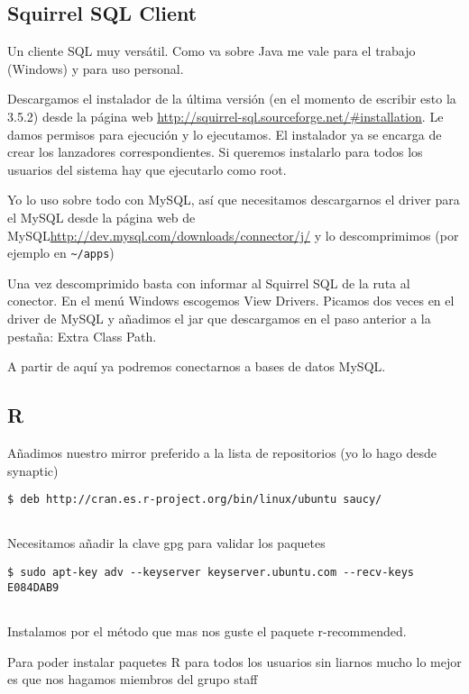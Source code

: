 \subsection{Squirrel SQL Client}\label{squirrel-sql-client}

Un cliente SQL muy versátil. Como va sobre Java me vale para el trabajo
(Windows) y para uso personal.

Descargamos el instalador de la última versión (en el momento de
escribir esto la 3.5.2) desde la página web
\url{http://squirrel-sql.sourceforge.net/\#installation}. Le damos
permisos para ejecución y lo ejecutamos. El instalador ya se encarga de
crear los lanzadores correspondientes. Si queremos instalarlo para todos
los usuarios del sistema hay que ejecutarlo como root.

Yo lo uso sobre todo con MySQL, así que necesitamos descargarnos el
driver para el MySQL desde la página web de
MySQL\url{http://dev.mysql.com/downloads/connector/j/} y lo
descomprimimos (por ejemplo en \texttt{\textasciitilde{}/apps})

Una vez descomprimido basta con informar al Squirrel SQL de la ruta al
conector. En el menú Windows escogemos View Drivers. Picamos dos veces
en el driver de MySQL y añadimos el jar que descargamos en el paso
anterior a la pestaña: Extra Class Path.

A partir de aquí ya podremos conectarnos a bases de datos MySQL.

\subsection{R}\label{r}

Añadimos nuestro mirror preferido a la lista de repositorios (yo lo hago
desde synaptic)

\begin{verbatim}
$ deb http://cran.es.r-project.org/bin/linux/ubuntu saucy/
      
\end{verbatim}

Necesitamos añadir la clave gpg para validar los paquetes

\begin{verbatim}
$ sudo apt-key adv --keyserver keyserver.ubuntu.com --recv-keys E084DAB9
      
\end{verbatim}

Instalamos por el método que mas nos guste el paquete r-recommended.

Para poder instalar paquetes R para todos los usuarios sin liarnos mucho
lo mejor es que nos hagamos miembros del grupo staff

